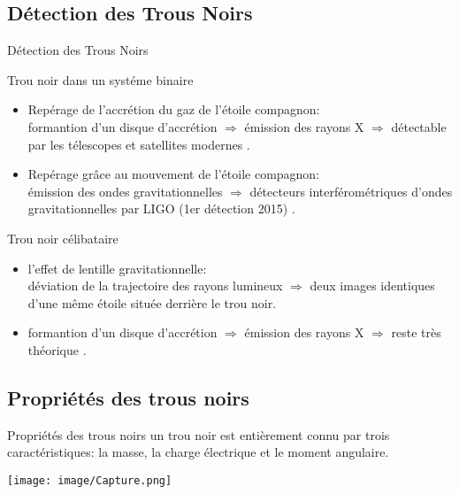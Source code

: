 \documentclass{beamer}
\begin{document}
%
\subsection{Détection des Trous Noirs }
\begin{frame}{Détection des Trous Noirs}


\begin{block}{Trou noir dans un systéme binaire}
\begin{itemize}
	\item Repérage de l'accrétion du gaz de l'étoile compagnon:\\
	
	formantion d'un disque d'accrétion $\Rightarrow$ émission des rayons X $\Rightarrow$ détectable par les télescopes et satellites modernes .
	\item    Repérage grâce au mouvement de l'étoile compagnon:\\
	émission des ondes gravitationnelles $\Rightarrow$
	détecteurs interférométriques d'ondes gravitationnelles par LIGO  (1er détection 2015) .
\end{itemize}
\end{block}
	\begin{block}{Trou noir célibataire}
		\begin{itemize}
		\item l'effet de lentille gravitationnelle:\\
	déviation de la trajectoire des rayons lumineux  $\Rightarrow$ deux images identiques d'une m\^{e}me étoile située derrière le trou noir. 
		\item formantion d'un disque d'accrétion $\Rightarrow$ émission des rayons X $\Rightarrow$ reste  très théorique .

\end{itemize}
\end{block}
\end{frame}
\subsection{Propriétés des trous noirs}
\begin{frame}
\begin{block}{Propriétés des trous noirs}
un trou noir est entièrement connu par  trois caractéristiques: la masse, la charge électrique et le moment angulaire.
\end{block}


		\texttt{[image: image/Capture.png]}	

\end{frame}
\end{document}
